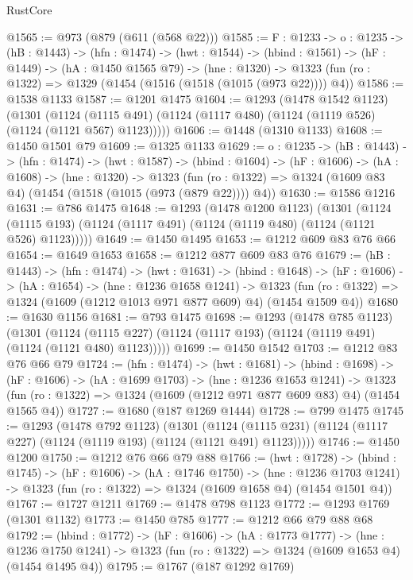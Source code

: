 \begin{lexlean}{RustCore}
\begin{coremodule}
@1565 := @973 (@879 (@611 (@568 @22)))
@1585 := {F : @1233} ->
  {o : @1235} ->
  (hB : @1443) ->
  (hfn : @1474) ->
  (hwt : @1544) ->
  (hbind : @1561) ->
  (hF : @1449) ->
  (hA : @1450 @1565 @79) ->
  (hne : @1320) -> @1323 (fun (ro : @1322) => @1329 (@1454 (@1516 (@1518 (@1015 (@973 @22)))) @4))
@1586 := @1538 @1133
@1587 := @1201 @1475
@1604 := @1293
    (@1478 @1542 @1123)
    (@1301
      (@1124 (@1115 @491) (@1124 (@1117 @480) (@1124 (@1119 @526) (@1124 (@1121 @567) @1123)))))
@1606 := @1448 (@1310 @1133)
@1608 := @1450 @1501 @79
@1609 := @1325 @1133
@1629 := {o : @1235} ->
  (hB : @1443) ->
  (hfn : @1474) ->
  (hwt : @1587) ->
  (hbind : @1604) ->
  (hF : @1606) ->
  (hA : @1608) ->
  (hne : @1320) ->
  @1323 (fun (ro : @1322) => @1324 (@1609 @83 @4) (@1454 (@1518 (@1015 (@973 (@879 @22)))) @4))
@1630 := @1586 @1216
@1631 := @786 @1475
@1648 := @1293
    (@1478 @1200 @1123)
    (@1301
      (@1124 (@1115 @193) (@1124 (@1117 @491) (@1124 (@1119 @480) (@1124 (@1121 @526) @1123)))))
@1649 := @1450 @1495
@1653 := @1212 @609 @83 @76 @66
@1654 := @1649 @1653
@1658 := @1212 @877 @609 @83 @76
@1679 := (hB : @1443) ->
  (hfn : @1474) ->
  (hwt : @1631) ->
  (hbind : @1648) ->
  (hF : @1606) ->
  (hA : @1654) ->
  (hne : @1236 @1658 @1241) ->
  @1323 (fun (ro : @1322) => @1324 (@1609 (@1212 @1013 @971 @877 @609) @4) (@1454 @1509 @4))
@1680 := @1630 @1156
@1681 := @793 @1475
@1698 := @1293
    (@1478 @785 @1123)
    (@1301
      (@1124 (@1115 @227) (@1124 (@1117 @193) (@1124 (@1119 @491) (@1124 (@1121 @480) @1123)))))
@1699 := @1450 @1542
@1703 := @1212 @83 @76 @66 @79
@1724 := (hfn : @1474) ->
  (hwt : @1681) ->
  (hbind : @1698) ->
  (hF : @1606) ->
  (hA : @1699 @1703) ->
  (hne : @1236 @1653 @1241) ->
  @1323 (fun (ro : @1322) => @1324 (@1609 (@1212 @971 @877 @609 @83) @4) (@1454 @1565 @4))
@1727 := @1680 (@187 @1269 @1444)
@1728 := @799 @1475
@1745 := @1293
    (@1478 @792 @1123)
    (@1301
      (@1124 (@1115 @231) (@1124 (@1117 @227) (@1124 (@1119 @193) (@1124 (@1121 @491) @1123)))))
@1746 := @1450 @1200
@1750 := @1212 @76 @66 @79 @88
@1766 := (hwt : @1728) ->
  (hbind : @1745) ->
  (hF : @1606) ->
  (hA : @1746 @1750) ->
  (hne : @1236 @1703 @1241) -> @1323 (fun (ro : @1322) => @1324 (@1609 @1658 @4) (@1454 @1501 @4))
@1767 := @1727 @1211
@1769 := @1478 @798 @1123
@1772 := @1293 @1769 (@1301 @1132)
@1773 := @1450 @785
@1777 := @1212 @66 @79 @88 @68
@1792 := (hbind : @1772) ->
  (hF : @1606) ->
  (hA : @1773 @1777) ->
  (hne : @1236 @1750 @1241) -> @1323 (fun (ro : @1322) => @1324 (@1609 @1653 @4) (@1454 @1495 @4))
@1795 := @1767 (@187 @1292 @1769)

\end{coremodule}
\end{lexlean}
